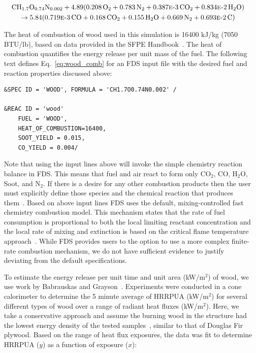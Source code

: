 \documentclass[11pt,oneside]{book}
\renewcommand{\C}{\mbox{C}}
\renewcommand{\H}{\mbox{H}}
\renewcommand{\O}{\mbox{O}}
\newcommand{\N}{\mbox{N}}
\begin{document}
\begin{multline}
\C\H_{1.7}\O_{0.74}\N_{0.002} + 4.89(0.208\,\O_{2} + 0.783\,\N_{2} + 0.387\text{\sc{e}-}3\,\C\O_{2} + 0.834\text{\sc{e}-}2\,\H_{2}\O) \\ 
\rightarrow 5.84(0.719\text{\sc{e}-}3\,\C\O + 0.168\,\C\O_{2} + 0.155\,\H_{2}\O + 0.669\,\N_{2} + 0.693\text{\sc{e}-}2\,\C)
\label{eq:wood_comb}
\end{multline}

The heat of combustion of wood used in this simulation is 16400 kJ/kg (7050 BTU/lb), based on data provided in the SFPE Handbook~\cite{SFPE:Tewarson}. The heat of combustion quantifies the energy release per unit mass of the fuel. The following text defines Eq.~\ref{eq:wood_comb} for an FDS input file with the desired fuel and reaction properties discussed above:

\begin{lstlisting}
&SPEC ID = 'WOOD', FORMULA = 'CH1.7O0.74N0.002' /

&REAC ID = 'wood' 
    FUEL = 'WOOD', 
    HEAT_OF_COMBUSTION=16400,
    SOOT_YIELD = 0.015,
    CO_YIELD = 0.004/
\end{lstlisting}

Note that using the input lines above will invoke the simple chemistry reaction balance in FDS. This means that fuel and air react to form only CO$_2$, CO, H$_2$O, Soot, and N$_2$. If there is a desire for any other combustion products then the user must explicitly define those species and the chemical reaction that produces them~\cite{FDS_Users_Guide}. Based on above input lines FDS uses the default, mixing-controlled fast chemistry combustion model. This mechanism  states that the rate of fuel consumption is proportional to both the local limiting reactant concentration and the local rate of mixing and extinction is based on the critical flame temperature approach~\cite{FDS_Math_Guide}. While FDS provides users to the option to use a more complex finite-rate combustion mechanism, we do not have sufficient evidence to justify deviating from the default specifications. 

To estimate the energy release per unit time and unit area (kW/m$^2$) of wood, we use work by Babrauskas and Grayson~\cite{babrauskas1990}. Experiments were conducted in a cone calorimeter to determine the 5 minute average of HRRPUA (kW/m$^2$) for several different types of wood over a range of radiant heat fluxes (kW/m$^2$). Here, we take a conservative approach and assume the burning wood in the structure had the lowest energy density of the tested samples~\cite{babrauskas1990}, similar to that of Douglas Fir plywood. Based on the range of heat flux exposures, the data was fit to determine HRRPUA ($y$) as a function of exposure ($x$):
\end{document}
